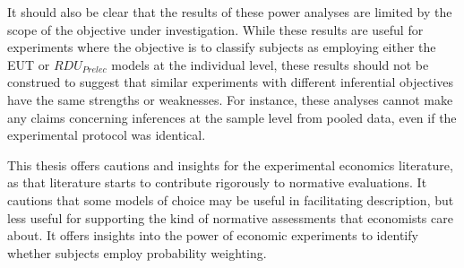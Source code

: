 \documentclass[../main.tex]{subfiles}
\begin{document}
It should also be clear that the results of these power analyses are limited by the scope of the objective under investigation.
While these results are useful for experiments where the objective is to classify subjects as employing either the EUT or $\mathit{RDU_{Prelec}}$ models at the individual level, these results should not be construed to suggest that similar experiments with different inferential objectives have the same strengths or weaknesses.
For instance, these analyses cannot make any claims concerning inferences at the sample level from pooled data, even if the experimental protocol was identical.

This thesis offers cautions and insights for the experimental economics literature, as that literature starts to contribute rigorously to normative evaluations.
It cautions that some models of choice may be useful in facilitating description, but less useful for supporting the kind of normative assessments that economists care about.
It offers insights into the power of economic experiments to identify whether subjects employ probability weighting.

\onlyinsubfile{
\newpage
\printbibliography[segment=5, heading=subbibliography]
}
\end{document}
